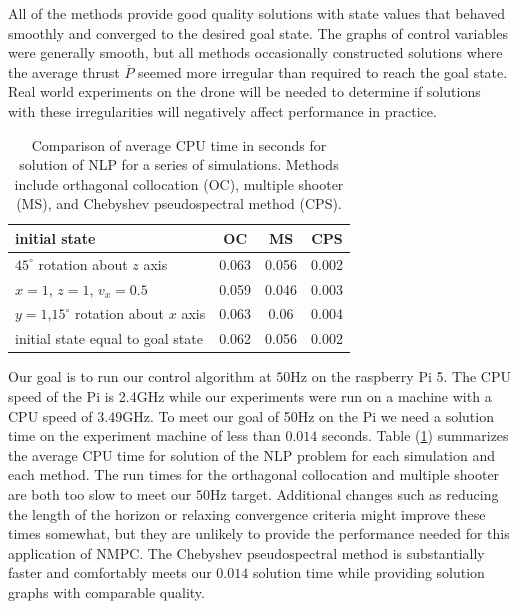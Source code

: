 \documentclass[]{article}
\begin{document}
All of the methods provide good quality solutions with state values that behaved smoothly and converged to the desired goal state. The graphs of control variables were generally smooth, but all methods occasionally constructed solutions where the  average thrust $\overline{P}$ seemed more irregular than required to reach the goal state.  Real world experiments on the drone will be needed to determine if solutions with these irregularities will negatively affect performance in practice.


\begin{table}[h!]	
	\begin{center}
		\begin{tabular}{ | l | c | c | c | } 
			\hline
			initial state & OC  & MS & CPS \\
			\hline
			$45^{\circ}$ rotation about $z$ axis & 0.063 &       0.056 & 0.002 \\ 
			$x = 1$, $z=1$, $v_x = 0.5$  & 0.059          &        0.046 & 0.003 \\ 
			$y = 1$,$15^{\circ}$ rotation about $x$ axis &0.063          &       0.06 & 0.004\\ 
				initial state equal to goal state & 0.062    &            0.056  & 0.002 \\ 
			\hline
		\end{tabular}
		\caption{Comparison of average CPU time in seconds for solution of NLP for a series of  simulations. Methods include orthagonal collocation (OC),  multiple shooter (MS), and Chebyshev pseudospectral method (CPS). }
		\label{table:CPU}
	\end{center}

\end{table}

 Our goal is to run our control algorithm at $50$Hz on the raspberry Pi 5. The CPU speed of the Pi is 2.4GHz while our experiments were run on a machine with a CPU speed of 3.49GHz. To meet our goal of 50Hz on the Pi we need a solution time on the experiment machine of less than $0.014$ seconds. Table (\ref{table:CPU}) summarizes the average CPU time for solution of the NLP problem for each simulation and each method.  The run times for the orthagonal collocation and multiple shooter are both too slow to meet our  $50$Hz target.  Additional changes such as reducing the length of the horizon or relaxing convergence criteria might improve these times somewhat, but they are unlikely to provide the performance needed for this application of NMPC.  The Chebyshev pseudospectral method is substantially faster and comfortably meets our $0.014$ solution time while providing solution graphs with comparable quality.
\end{document}
